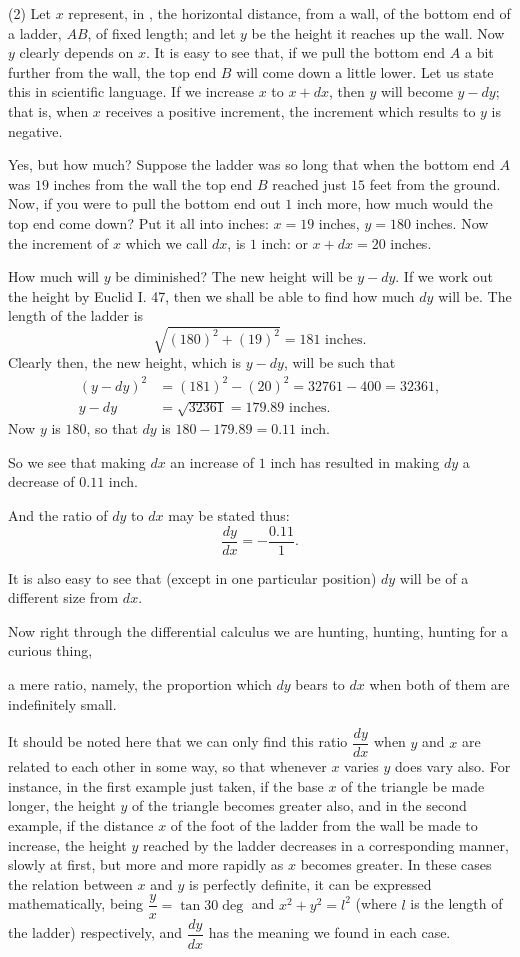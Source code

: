 \documentclass{ximera}
\begin{document}
(2) Let $x$ represent, in %
, the horizontal distance,
from a wall, of the bottom end of a ladder, $AB$,
of fixed length; and let $y$ be the height it
reaches up the wall. Now $y$ clearly depends on $x$.
It is easy to see that, if we pull the bottom end $A$ a
bit further from the wall, the top end $B$ will come
down a little lower. Let us state this in scientific
language. If we increase $x$ to $x + dx$, then $y$ will
become $y - dy$; that is, when $x$ receives a positive
increment, the increment which results to $y$ is
negative.

Yes, but how much? Suppose the ladder was so
long that when the bottom end $A$ was $19$ inches from
the wall the top end $B$ reached just $15$ feet from the
ground. Now, if you were to pull the bottom end
out $1$ inch more, how much would the top end come
down? Put it all into inches: $x = 19$ inches, $y = 180$
inches. Now the increment of $x$ which we call $dx$,
is $1$ inch: or $x + dx = 20$ inches.

How much will $y$ be diminished? The new height
will be $y - dy$. If we work out the height by Euclid
I. 47, then we shall be able to find how much $dy$ will
be. The length of the ladder is
\[
\sqrt{ (180)^2 + (19)^2 } = 181 \text{ inches}.
\]
Clearly then, the new height, which is $y - dy$, will be
such that
\begin{align*}
(y - dy)^2 &= (181)^2 - (20)^2 = 32761 - 400 = 32361,   \\
y - dy     &= \sqrt{32361} = 179.89 \text{ inches}.
\end{align*}
Now $y$ is $180$, so that $dy$ is $180 - 179.89 = 0.11$ inch.

So we see that making $dx$ an increase of $1$ inch
has resulted in making $dy$ a decrease of $0.11$ inch.

And the ratio of $dy$ to $dx$ may be stated thus:
\[
\frac{dy}{dx} = - \frac{0.11}{1}.
\]

It is also easy to see that (except in one particular
position) $dy$ will be of a different size from $dx$.

Now right through the differential calculus we
are hunting, hunting, hunting for a curious thing,

a mere ratio, namely, the proportion which $dy$ bears
to $dx$ when both of them are indefinitely
small.

It should be noted here that we can only find
this ratio $\dfrac{dy}{dx}$ when $y$ and $x$ are related to each
other in some way, so that whenever $x$ varies $y$ does
vary also. For instance, in the first example just
taken, if the base $x$ of the triangle be made longer,
the height $y$ of the triangle becomes greater also,
and in the second example, if the distance $x$ of the
foot of the ladder from the wall be made to increase,
the height $y$ reached by the ladder decreases in a
corresponding manner, slowly at first, but more and
more rapidly as $x$ becomes greater. In these cases
the relation between $x$ and $y$ is perfectly definite,
it can be expressed mathematically, being $\dfrac{y}{x} = \tan 30\deg$
and $x^2 + y^2 = l^2$ (where $l$ is the length of the ladder)
respectively, and $\dfrac{dy}{dx}$ has the meaning we found in
each case.
\end{document}
